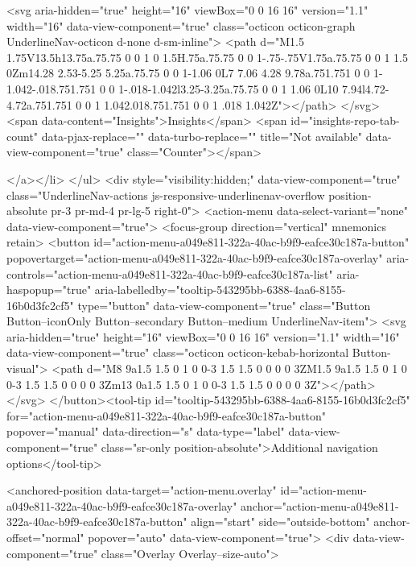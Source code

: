               <svg aria-hidden="true" height="16" viewBox="0 0 16 16" version="1.1" width="16" data-view-component="true" class="octicon octicon-graph UnderlineNav-octicon d-none d-sm-inline">
    <path d="M1.5 1.75V13.5h13.75a.75.75 0 0 1 0 1.5H.75a.75.75 0 0 1-.75-.75V1.75a.75.75 0 0 1 1.5 0Zm14.28 2.53-5.25 5.25a.75.75 0 0 1-1.06 0L7 7.06 4.28 9.78a.751.751 0 0 1-1.042-.018.751.751 0 0 1-.018-1.042l3.25-3.25a.75.75 0 0 1 1.06 0L10 7.94l4.72-4.72a.751.751 0 0 1 1.042.018.751.751 0 0 1 .018 1.042Z"></path>
</svg>
        <span data-content="Insights">Insights</span>
          <span id="insights-repo-tab-count" data-pjax-replace="" data-turbo-replace="" title="Not available" data-view-component="true" class="Counter"></span>


    
</a></li>
</ul>
    <div style="visibility:hidden;" data-view-component="true" class="UnderlineNav-actions js-responsive-underlinenav-overflow position-absolute pr-3 pr-md-4 pr-lg-5 right-0">      <action-menu data-select-variant="none" data-view-component="true">
  <focus-group direction="vertical" mnemonics retain>
    <button id="action-menu-a049e811-322a-40ac-b9f9-eafce30c187a-button" popovertarget="action-menu-a049e811-322a-40ac-b9f9-eafce30c187a-overlay" aria-controls="action-menu-a049e811-322a-40ac-b9f9-eafce30c187a-list" aria-haspopup="true" aria-labelledby="tooltip-543295bb-6388-4aa6-8155-16b0d3fc2cf5" type="button" data-view-component="true" class="Button Button--iconOnly Button--secondary Button--medium UnderlineNav-item">  <svg aria-hidden="true" height="16" viewBox="0 0 16 16" version="1.1" width="16" data-view-component="true" class="octicon octicon-kebab-horizontal Button-visual">
    <path d="M8 9a1.5 1.5 0 1 0 0-3 1.5 1.5 0 0 0 0 3ZM1.5 9a1.5 1.5 0 1 0 0-3 1.5 1.5 0 0 0 0 3Zm13 0a1.5 1.5 0 1 0 0-3 1.5 1.5 0 0 0 0 3Z"></path>
</svg>
</button><tool-tip id="tooltip-543295bb-6388-4aa6-8155-16b0d3fc2cf5" for="action-menu-a049e811-322a-40ac-b9f9-eafce30c187a-button" popover="manual" data-direction="s" data-type="label" data-view-component="true" class="sr-only position-absolute">Additional navigation options</tool-tip>


<anchored-position data-target="action-menu.overlay" id="action-menu-a049e811-322a-40ac-b9f9-eafce30c187a-overlay" anchor="action-menu-a049e811-322a-40ac-b9f9-eafce30c187a-button" align="start" side="outside-bottom" anchor-offset="normal" popover="auto" data-view-component="true">
  <div data-view-component="true" class="Overlay Overlay--size-auto">
    
